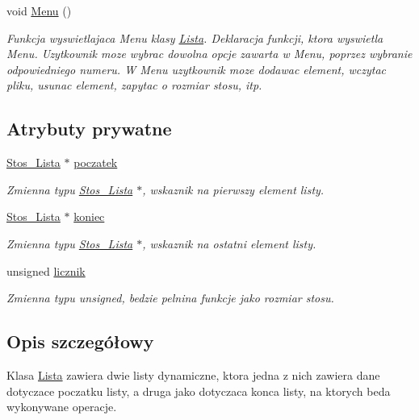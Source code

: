 \begin{DoxyCompactItemize}
void \hyperlink{class_lista_a2921d7ad3ed24e5d0d7d59d5b39c8eb3}{\-Menu} ()
\begin{DoxyCompactList}\small\item\em \-Funkcja wyswietlajaca \-Menu klasy \hyperlink{class_lista}{\-Lista}. \-Deklaracja funkcji, ktora wyswietla \-Menu. \-Uzytkownik moze wybrac dowolna opcje zawarta w \-Menu, poprzez wybranie odpowiedniego numeru. \-W \-Menu uzytkownik moze dodawac element, wczytac pliku, usunac element, zapytac o rozmiar stosu, itp. \end{DoxyCompactList}\end{DoxyCompactItemize}
\subsection*{\-Atrybuty prywatne}
\begin{DoxyCompactItemize}
\item 
\hyperlink{struct_stos___lista}{\-Stos\-\_\-\-Lista} $\ast$ \hyperlink{class_lista_a86a0427913a82e41da202168e209bd06}{poczatek}
\begin{DoxyCompactList}\small\item\em \-Zmienna typu \hyperlink{struct_stos___lista}{\-Stos\-\_\-\-Lista} $\ast$, wskaznik na pierwszy element listy. \end{DoxyCompactList}\item 
\hyperlink{struct_stos___lista}{\-Stos\-\_\-\-Lista} $\ast$ \hyperlink{class_lista_a74098fc9225d008398096c33e6f2c76b}{koniec}
\begin{DoxyCompactList}\small\item\em \-Zmienna typu \hyperlink{struct_stos___lista}{\-Stos\-\_\-\-Lista} $\ast$, wskaznik na ostatni element listy. \end{DoxyCompactList}\item 
unsigned \hyperlink{class_lista_a3cbc0beed9a449e0fb2f66bb6bd393d3}{licznik}
\begin{DoxyCompactList}\small\item\em \-Zmienna typu unsigned, bedzie pelnina funkcje jako rozmiar stosu. \end{DoxyCompactList}\end{DoxyCompactItemize}


\subsection{\-Opis szczegółowy}
\-Klasa \hyperlink{class_lista}{\-Lista} zawiera dwie listy dynamiczne, ktora jedna z nich zawiera dane dotyczace poczatku listy, a druga jako dotyczaca konca listy, na ktorych beda wykonywane operacje. 

